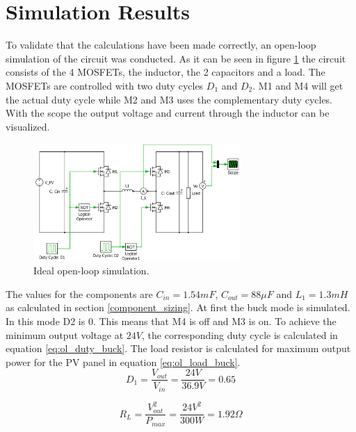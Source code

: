 \section{Simulation Results} \label{opsimresult}

To validate that the calculations have been made correctly, an open-loop simulation of the circuit was conducted. As it can be seen in figure \ref{fig:openloop_schematic} the circuit consists of the 4 MOSFETs, the inductor, the 2 capacitors and a load. The MOSFETs are controlled with two duty cycles $D_1$ and $D_2$. M1 and M4 will get the actual duty cycle while M2 and M3 uses the complementary duty cycles. With the scope the output voltage and current through the inductor can be visualized.

\begin{figure}[H]
	\begin{center}
		\includegraphics[width=0.7\textwidth]{../Pictures/P1/Open_loop_simulation/open_loop_schematic}
		\caption{Ideal open-loop simulation.}
		\label{fig:openloop_schematic}
	\end{center}
\end{figure}

The values for the components are $C_{in}=1.54mF$, $C_{out}=88 \mu F$ and $L_{1}=1.3mH$ as calculated in section \ref{component_sizing}. At first the buck mode is simulated. In this mode D2 is 0. This means that M4 is off and M3 is on. To achieve the minimum output voltage at $24V$, the corresponding duty cycle is calculated in equation \ref{eq:ol_duty_buck}. The load resistor is calculated for maximum output power for the PV panel in equation \ref{eq:ol_load_buck}.
\begin{equation} \label{eq:ol_duty_buck}
	D_1= \frac{V_{out}}{V_{in}} = \frac{24V}{36.9V} = 0.65
\end{equation}

\begin{equation} \label{eq:ol_load_buck}
	R_L = \frac{V_{out}^2}{P_{max}} = \frac{24V^2}{300W} = 1.92 \Omega
\end{equation}

